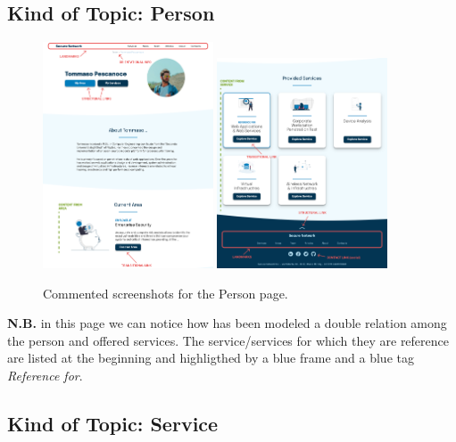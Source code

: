 \documentclass[12pt]{report}
\begin{document}
\subsection{Kind of Topic: Person}

\begin{figure}[H]
	\centering
	\includegraphics[width=0.45\textwidth]{high_fid_wireframes/person/1.png}
	\includegraphics[width=0.45\textwidth]{high_fid_wireframes/person/2.png}
	\caption{Commented screenshots for the Person page.}
\end{figure}
\textbf{N.B.} in this page we can notice how has been modeled a double relation
among the person and offered services. The service/services for which they are reference
are listed at the beginning and highligthed by a blue frame and a blue tag \emph{Reference for}.
\subsection{Kind of Topic: Service}
\end{document}
